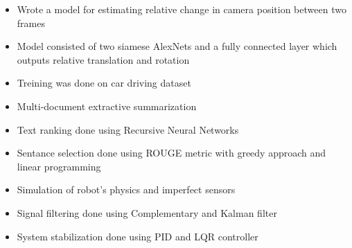 \documentclass[10pt,a4paper]{altacv}
\begin{document}



\begin{itemize}
    \item \small{Wrote a model for estimating relative change in camera position between two frames}
    \item \small{Model consisted of two siamese AlexNets and a fully connected layer which outputs relative translation and rotation}
    \item \small{Treining was done on car driving dataset}
    \\
    \smallskip
      
\end{itemize}
    
\divider


\begin{itemize}
  \item \small{Multi-document extractive summarization}
  \item \small{Text ranking done using Recursive Neural Networks}
  \item \small{Sentance selection done using ROUGE metric with greedy approach and linear programming}
  \\
  \smallskip
    
\end{itemize}

\divider

%



\begin{itemize}
    \item \small{Simulation of robot's physics and imperfect sensors}
    \item \small{Signal filtering done using Complementary and Kalman filter}
    \item \small{System stabilization done using PID and LQR controller}
    \\
    \smallskip
     
\end{itemize}
\end{document}
